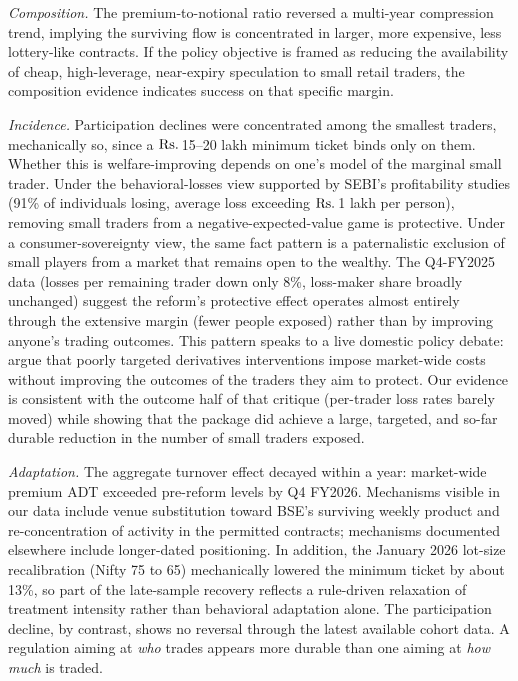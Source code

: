 \documentclass[12pt]{article}
\newcommand{\rupee}{\text{Rs.}\,}
\begin{document}
\emph{Composition.} The premium-to-notional ratio reversed a multi-year
compression trend, implying the surviving flow is concentrated in larger,
more expensive, less lottery-like contracts. If the policy objective is
framed as reducing the availability of cheap, high-leverage, near-expiry
speculation to small retail traders, the composition evidence indicates
success on that specific margin.

\emph{Incidence.} Participation declines were concentrated among the
smallest traders, mechanically so, since a \(\text{\rupee}\)15--20 lakh
minimum ticket binds only on them. Whether this is welfare-improving
depends on one's model of the marginal small trader. Under the
behavioral-losses view supported by SEBI's profitability studies (91\% of
individuals losing, average loss exceeding \(\text{\rupee}\)1 lakh per
person), removing small traders from a negative-expected-value game is
protective. Under a consumer-sovereignty view, the same fact pattern is a
paternalistic exclusion of small players from a market that remains open to
the wealthy. The Q4-FY2025 data (losses per remaining trader down only
8\%, loss-maker share broadly unchanged) suggest the reform's protective
effect operates almost entirely through the extensive margin (fewer people
exposed) rather than by improving anyone's trading outcomes. This pattern
speaks to a live domestic policy debate: \citet{aggarwalmitra2026} argue
that poorly targeted derivatives interventions impose market-wide costs
without improving the outcomes of the traders they aim to protect. Our
evidence is consistent with the outcome half of that critique (per-trader
loss rates barely moved) while showing that the package did achieve a
large, targeted, and so-far durable reduction in the number of small
traders exposed.

\emph{Adaptation.} The aggregate turnover effect decayed within a year:
market-wide premium ADT exceeded pre-reform levels by Q4 FY2026. Mechanisms
visible in our data include venue substitution toward BSE's surviving weekly
product and re-concentration of activity in the permitted contracts;
mechanisms documented elsewhere include longer-dated positioning. In
addition, the January 2026 lot-size recalibration (Nifty 75 to 65)
mechanically lowered the minimum ticket by about 13\%, so part of the
late-sample recovery reflects a rule-driven relaxation of treatment
intensity rather than behavioral adaptation alone. The
participation decline, by contrast, shows no reversal through the latest
available cohort data. A regulation aiming at \emph{who} trades appears more
durable than one aiming at \emph{how much} is traded.
\end{document}
